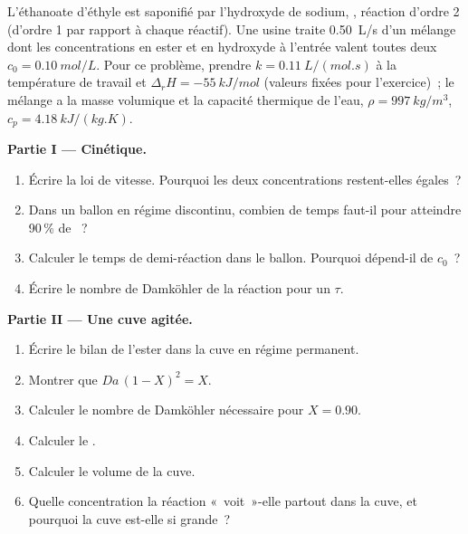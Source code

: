 \begin{problem}
\label{pb:b2:continuous-reactors:1}
L'éthanoate d'éthyle est saponifié par l'hydroxyde de sodium,
, réaction d'ordre 2 (d'ordre 1
par rapport à chaque réactif). Une usine traite \qty{0.50}{L/s} d'un mélange dont les
concentrations en ester et en hydroxyde à l'entrée valent toutes deux $c_0 =
\qty{0.10}{mol/L}$. Pour ce problème, prendre $k = \qty{0.11}{L/(mol.s)}$ à la
température de travail et $\Delta_r H = \qty{-55}{kJ/mol}$ (valeurs fixées pour
l'exercice)~; le mélange a la masse volumique et la capacité thermique de l'eau,
$\rho = \qty{997}{kg/m^3}$, $c_p = \qty{4.18}{kJ/(kg.K)}$.

\medskip
\noindent\textbf{Partie I --- Cinétique.}
\begin{enumerate}
  \item Écrire la loi de vitesse. Pourquoi les deux concentrations restent-elles égales~?
  \item Dans un ballon en régime discontinu, combien de temps faut-il pour atteindre 90\,\% de ~?
  \item Calculer le temps de demi-réaction dans le ballon. Pourquoi dépend-il de $c_0$~?
  \item Écrire le nombre de Damköhler de la réaction pour un  $\tau$.
\end{enumerate}

\medskip
\noindent\textbf{Partie II --- Une cuve agitée.}
\begin{enumerate}[resume]
  \item Écrire le bilan de l'ester dans la cuve en régime permanent.
  \item Montrer que $Da\,(1 - X)^2 = X$.
  \item Calculer le nombre de Damköhler nécessaire pour $X = 0.90$.
  \item Calculer le .
  \item Calculer le volume de la cuve.
  \item Quelle concentration la réaction «~voit~»-elle partout dans la cuve,
        et pourquoi la cuve est-elle si grande~?
\end{enumerate}


\end{problem}
